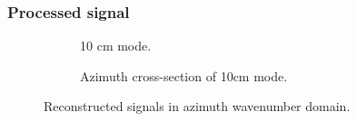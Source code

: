\documentclass{beamer}
\begin{document}
\begin{frame}
\frametitle{Processed signal}
\begin{figure}[ht!]
\begin{center}
\begin{subfigure}{0.4\textwidth}
 \caption{10 cm mode.}
 \label{fg:10cmreconstructed}
\end{subfigure}
\begin{subfigure}{0.4\textwidth}
 \caption{Azimuth cross-section of 10cm mode.}
 \label{fg:azimuthCross10}
\end{subfigure}
\end{center}
\caption{Reconstructed signals in azimuth wavenumber domain.}
\label{fg:reconstructed}
\end{figure}
\end{frame}
\end{document}

